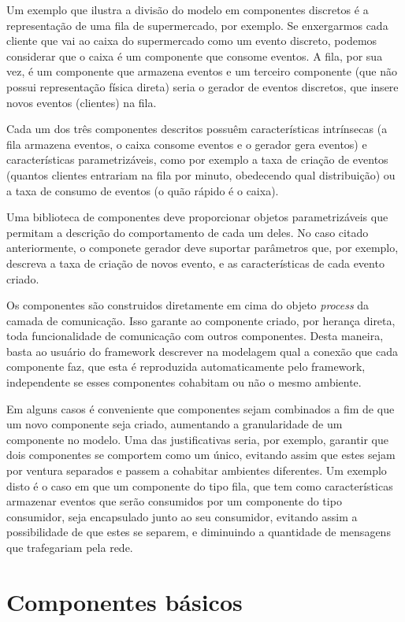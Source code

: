 Um exemplo que ilustra a divisão do modelo em componentes discretos é a representação de uma fila de supermercado, por exemplo. Se enxergarmos cada cliente que vai ao caixa do supermercado como um evento discreto, podemos considerar que o caixa é um componente que consome eventos. A fila, por sua vez, é um componente que armazena eventos e um terceiro componente (que não possui representação física direta) seria o gerador de eventos discretos, que insere novos eventos (clientes) na fila.

Cada um dos três componentes descritos possuêm características intrínsecas (a fila armazena eventos, o caixa consome eventos e o gerador gera eventos) e características parametrizáveis, como por exemplo a taxa de criação de eventos (quantos clientes entrariam na fila por minuto, obedecendo qual distribuição) ou a taxa de consumo de eventos (o quão rápido é o caixa).

Uma biblioteca de componentes deve proporcionar objetos parametrizáveis que permitam a descrição do comportamento de cada um deles. No caso citado anteriormente, o componete gerador deve suportar parâmetros que, por exemplo, descreva a taxa de criação de novos evento, e as características de cada evento criado.

Os componentes são construidos diretamente em cima do objeto \textit{process} da camada de comunicação. Isso garante ao componente criado, por herança direta, toda funcionalidade de comunicação com outros componentes. Desta maneira, basta ao usuário do framework descrever na modelagem qual a conexão que cada componente faz, que esta é reproduzida automaticamente pelo framework, independente se esses componentes cohabitam ou não o mesmo ambiente.

Em alguns casos é conveniente que componentes sejam combinados a fim de que um novo componente seja criado, aumentando a granularidade de um componente no modelo. Uma das justificativas seria, por exemplo, garantir que dois componentes se comportem como um único, evitando assim que estes sejam por ventura separados e passem a cohabitar ambientes diferentes. Um exemplo disto é o caso em que um componente do tipo fila, que tem como características armazenar eventos que serão consumidos por um componente do tipo consumidor, seja encapsulado junto ao seu consumidor, evitando assim a possibilidade de que estes se separem, e diminuindo a quantidade de mensagens que trafegariam pela rede.

\section{Componentes básicos}


